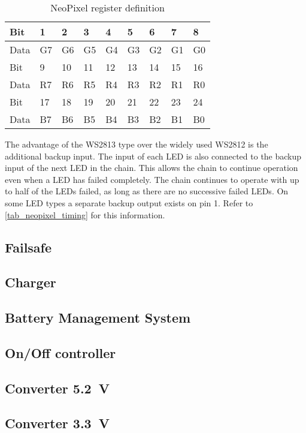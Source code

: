 \begin{table}[h!]
    \centering
    \begin{tabular}{|l|l|l|l|l|l|l|l|l|}
        \hline
        Bit     & 1  & 2  & 3  & 4  & 5  & 6  & 7  & 8  \\
        \hline
        Data    & G7 & G6 & G5 & G4 & G3 & G2 & G1 & G0 \\
        \hline
        \hline
        Bit     & 9  & 10 & 11 & 12 & 13 & 14 & 15 & 16 \\
        \hline
        Data    & R7 & R6 & R5 & R4 & R3 & R2 & R1 & R0 \\
        \hline
        \hline
        Bit     & 17 & 18 & 19 & 20 & 21 & 22 & 23 & 24 \\
        \hline
        Data    & B7 & B6 & B5 & B4 & B3 & B2 & B1 & B0 \\ 
        \hline
    \end{tabular}
    \caption{NeoPixel register definition}
    \label{tab_neopixel_register}
\end{table}

The advantage of the WS2813 type over the widely used WS2812 is the additional backup input. The input of each \ac{LED} is also connected to the backup input of the next \ac{LED} in the chain. This allows the chain to continue operation even when a \ac{LED} has failed completely. The chain continues to operate with up to half of the \acp{LED} failed, as long as there are no successive failed \acp{LED}. On some \ac{LED} types a separate backup output exists on pin 1. Refer to \autoref{tab_neopixel_timing} for this information. 

\subsection{Failsafe}

\subsection{Charger}

\subsection{Battery Management System}

\subsection{On/Off controller}

\subsection{Converter \SI{5.2}{\volt}}

\subsection{Converter \SI{3.3}{\volt}}
\label{sec_power_3V3}


